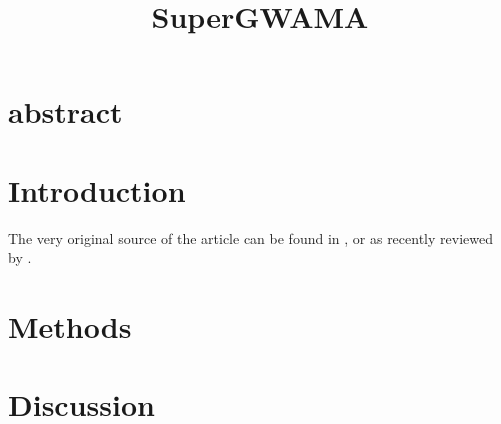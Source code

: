 \documentclass[10pt,GBK,UTF8]{article}
\date{} %
\title{SuperGWAMA}
\begin{document}
\maketitle

\newpage
\section{abstract}

\section{Introduction}
The very original source of the article can be found in \cite{Niu2017, Chen2017, He2024}, or as recently reviewed by \cite{Kontou2024}.

\section{Methods}
\section{Discussion}
\clearpage


\end{document}
